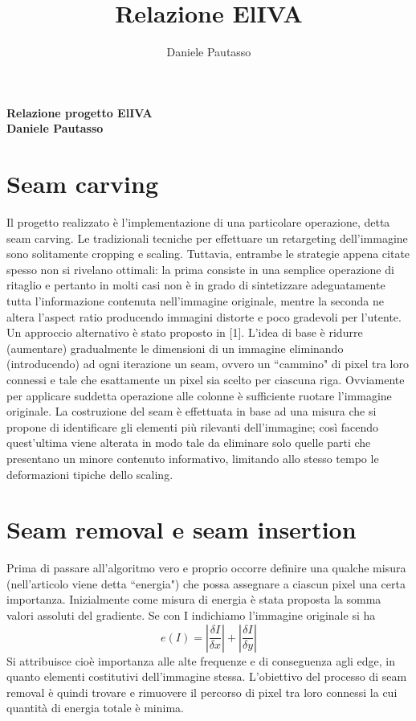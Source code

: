 \documentclass[12pt,a4paper]{report}
\title{Relazione ElIVA}
\author{Daniele Pautasso}
\theoremstyle{plain}
\theoremstyle{definition}
\begin{document}
\begin{Large}
\begin{center}
\textbf{Relazione progetto ElIVA\\ \vskip 0.3cm Daniele Pautasso\\}
\end{center}
\end{Large}

\section*{Seam carving}
Il progetto realizzato è l'implementazione di una particolare operazione, detta seam carving. Le tradizionali tecniche per effettuare un retargeting dell'immagine sono solitamente cropping e scaling. Tuttavia, entrambe le strategie appena citate spesso non si rivelano ottimali: la prima consiste in una semplice operazione di ritaglio e pertanto in molti casi non è in grado di sintetizzare adeguatamente tutta l'informazione contenuta nell'immagine originale, mentre la seconda ne altera l'aspect ratio producendo immagini distorte e poco gradevoli per l'utente. Un approccio alternativo è stato proposto in [1]. L'idea di base è ridurre (aumentare) gradualmente le dimensioni di un immagine eliminando (introducendo) ad ogni iterazione un seam, ovvero un ``cammino" di pixel tra loro connessi e tale che esattamente un pixel sia scelto per ciascuna riga. Ovviamente per applicare suddetta operazione alle colonne è sufficiente ruotare l'immagine originale. La costruzione del seam è effettuata in base ad una misura che si propone di identificare gli elementi più rilevanti dell'immagine; così facendo quest'ultima viene alterata in modo tale da eliminare solo quelle parti che presentano un minore contenuto informativo, limitando allo stesso tempo le deformazioni tipiche dello scaling. 

\section*{Seam removal e seam insertion}
Prima di passare all'algoritmo vero e proprio occorre definire una qualche misura (nell'articolo viene detta ``energia") che possa assegnare a ciascun pixel una certa importanza.  Inizialmente come misura di energia è stata proposta la somma valori assoluti del gradiente. Se con I indichiamo l'immagine originale si ha 
\[ e(I) = | \frac{\delta I}{\delta x} | + | \frac{\delta I}{\delta y} |\]
Si attribuisce cioè importanza alle alte frequenze e di conseguenza agli edge, in quanto elementi costitutivi dell'immagine stessa. L'obiettivo del processo di seam removal è quindi trovare e rimuovere il percorso di pixel tra loro connessi la cui quantità di energia totale è minima.
\end{document}

